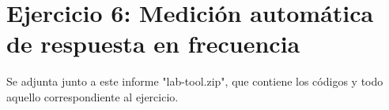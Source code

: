 \section{Ejercicio 6: Medici\'on autom\'atica de respuesta en frecuencia}

Se adjunta junto a este informe "lab-tool.zip", que contiene los c\'odigos y todo aquello correspondiente al ejercicio.